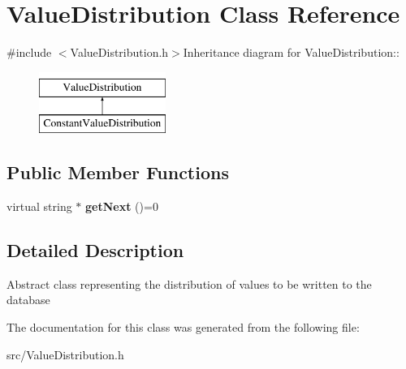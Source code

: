 \hypertarget{classValueDistribution}{
\section{ValueDistribution Class Reference}
\label{classValueDistribution}
}


{\ttfamily \#include $<$ValueDistribution.h$>$}Inheritance diagram for ValueDistribution::\begin{figure}[H]
\begin{center}
\leavevmode
\includegraphics[height=2cm]{classValueDistribution}
\end{center}
\end{figure}
\subsection*{Public Member Functions}
\begin{DoxyCompactItemize}
\item 
\hypertarget{classValueDistribution_ad39dd4a07241d433bb8f5ac5026c1d6d}{
virtual string $\ast$ {\bfseries getNext} ()=0}
\label{classValueDistribution_ad39dd4a07241d433bb8f5ac5026c1d6d}

\end{DoxyCompactItemize}


\subsection{Detailed Description}
Abstract class representing the distribution of values to be written to the database 

The documentation for this class was generated from the following file:\begin{DoxyCompactItemize}
\item 
src/ValueDistribution.h\end{DoxyCompactItemize}
